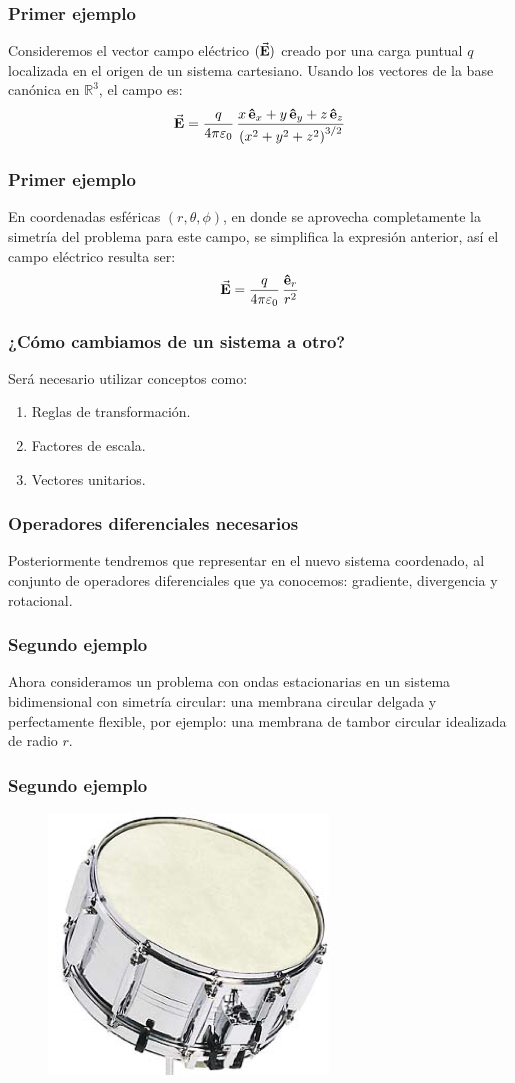 \documentclass[12pt]{beamer}
\begin{document}
\begin{frame}
\frametitle{Primer ejemplo}
Consideremos el vector campo eléctrico $(\va{E})$ creado por una carga puntual $q$ localizada en el origen de un sistema cartesiano. \pause Usando los vectores de la base canónica en $\mathbb{R}^{3}$, el campo es:
\pause
\begin{align*}
\va{E} = \dfrac{q}{4 \pi \varepsilon_{0}} \, \dfrac{x \, \vu{e}_{x} + y \, \vu{e}_{y} + z \, \vu{e}_{z}}{\left( x^{2} + y^{2} + z^{2} \right)^{3/2}}
\end{align*}
\end{frame}
\begin{frame}
\frametitle{Primer ejemplo}
En coordenadas esféricas $(r, \theta, \phi)$, en donde se aprovecha completamente la simetría del problema para este campo, se simplifica la expresión anterior, \pause así el campo eléctrico resulta ser:
\begin{align*}
\va{\vb{E}} = \dfrac{q}{4 \pi \varepsilon_{0}} \, \dfrac{\vu{e}_{r}}{r^{2}}
\end{align*}
\end{frame}
\begin{frame}
\frametitle{¿Cómo cambiamos de un sistema a otro?}
Será necesario utilizar conceptos como:
\pause
\begin{enumerate}[<+->]
\item Reglas de transformación.
\item Factores de escala.
\item Vectores unitarios.
\end{enumerate}
\end{frame}
\begin{frame}
\frametitle{Operadores diferenciales necesarios}
Posteriormente tendremos que representar en el nuevo sistema coordenado, al conjunto de operadores diferenciales que ya conocemos: gradiente, divergencia y rotacional.
\end{frame}
\begin{frame}
\frametitle{Segundo ejemplo}
Ahora consideramos un problema con ondas estacionarias en un sistema bidimensional con simetría circular: una membrana circular delgada y perfectamente flexible, por ejemplo: una membrana de tambor circular idealizada de radio $r$.
\end{frame}
\begin{frame}
\frametitle{Segundo ejemplo}
\begin{figure}[H]
  \centering
  \includegraphics[scale=0.75]{Imagenes/Tambor.png}
\end{figure}
\end{frame}
\end{document}
